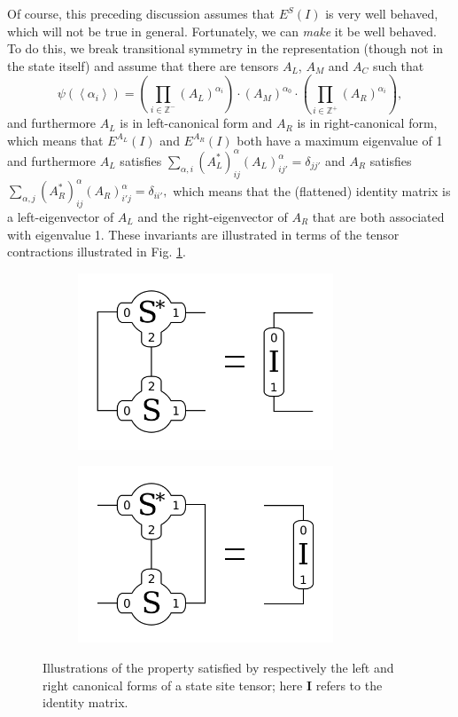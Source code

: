 \documentclass{article}
\newcommand{\paren}[1]{\left(#1\right)}
\newcommand{\seq}[1]{\left<#1\right>}
\newcommand{\Z}{\mathbb{Z}}
\begin{document}
Of course, this preceding discussion assumes that $E^S(I)$ is very well behaved, which will not be true in general.  Fortunately, we can \emph{make} it be well behaved.  To do this, we break transitional symmetry in the representation (though not in the state itself) and assume that there are tensors $A_L$, $A_M$ and $A_C$ such that \begin{equation}
\label{eq:newform}
\psi(\seq{\alpha_i}) = \paren{\prod_{i\in\Z^-}(A_L)^{\alpha_i}}\cdot (A_M)^{\alpha_0}\cdot \paren{\prod_{i\in\Z^+}(A_R)^{\alpha_i}},\end{equation}
and furthermore $A_L$ is in left-canonical form and $A_R$ is in right-canonical form, which means that $E^{A_L}(I)$ and $E^{A_R}(I)$ both have a maximum eigenvalue of 1 and furthermore $A_L$ satisfies $\sum_{\alpha,i}(A_L^*)^{\alpha}_{ij}(A_L)^{\alpha}_{ij'}=\delta_{jj'}$ and $A_R$ satisfies $\sum_{\alpha,j}(A_R^*)^{\alpha}_{ij}(A_R)^{\alpha}_{i'j}=\delta_{ii'},$  which means that the (flattened) identity matrix is a left-eigenvector of $A_L$ and the right-eigenvector of $A_R$ that are both associated with eigenvalue 1.  These invariants are illustrated in terms of the tensor contractions illustrated in Fig. \ref{fig:canonical-car}.
\begin{figure}
\centering
\begin{subfigure}{3in}
\includegraphics[width=3in]{drawings/canonical-left-car}
\end{subfigure}
\begin{subfigure}{3in}
\includegraphics[width=3in]{drawings/canonical-right-car}
\end{subfigure}
\caption{\label{fig:canonical-car} Illustrations of the property satisfied by respectively the left and right canonical forms of a state site tensor; here \textbf{I} refers to the identity matrix.}
\end{figure}
\end{document}
